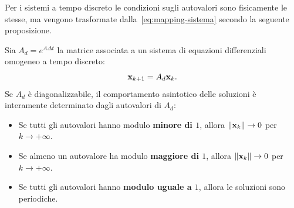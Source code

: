 Per i sistemi a tempo discreto le condizioni
sugli autovalori sono fisicamente le stesse,
ma vengono trasformate dalla~\eqref{eq:mapping-sistema} secondo la
seguente proposizione.
\begin{prop}
    Sia $A_d = e^{A\Delta t}$ la matrice associata a un sistema di equazioni differenziali omogeneo
    a tempo discreto:
    \begin{equation*}
        \mathbf{x}_{k+1} = A_d \mathbf{x}_k.
    \end{equation*}
    Se $A_d$ è diagonalizzabile, il comportamento asintotico delle soluzioni è interamente
    determinato dagli autovalori di $A_d$:
    \begin{itemize}
        \item Se tutti gli autovalori hanno modulo \textbf{minore di $1$}, allora $\lVert\mathbf{x}_k\rVert \to 0$ per $k \to +\infty$.%
        \item Se almeno un autovalore ha modulo \textbf{maggiore di $1$}, allora $\lVert\mathbf{x}_k\rVert \to 0$ per $k \to +\infty$.%
        \item Se tutti gli autovalori hanno \textbf{modulo uguale a $1$}, allora le soluzioni sono periodiche.
    \end{itemize}
\end{prop}